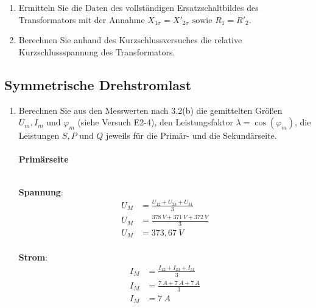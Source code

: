 \begin{enumerate}[label=\alph*)]
	\item Ermitteln Sie die Daten des vollständigen Ersatzschaltbildes des Transformators
	      mit der Annahme $X_{1\sigma} = X'_{2\sigma} \text{ sowie } R_1 = R'_2$.

	\item Berechnen Sie anhand des Kurzschlussversuches die relative Kurzschlussspannung
	      des Transformators.

\end{enumerate}
\subsection{Symmetrische Drehstromlast}
\begin{enumerate}[label=\alph*)]

	\item Berechnen Sie aus den Messwerten nach 3.2(b) die gemittelten Größen $U_m, I_m
		      \text{ und } \varphi_m$ (siehe Versuch E2-4), den Leistungsfaktor $\lambda =
		      \cos(\varphi_m)$, die Leistungen $S, P \text{ und } Q$ jeweils für die Primär-
	      und die Sekundärseite.\\ \ \\

	      \textbf{Primärseite}\\ \ \\

	      \begin{tcolorbox}[colback=gray!30,
			      colframe=black,
			      width=0.9\textwidth,
		      ]
		      \parbox{\textwidth}{

			      \begin{minipage}{0.5\textwidth}
				      \textbf{Spannung}:
				      \begin{align*}
					      U_M & = \frac{U_{12} + U_{23} + U_{31}}{3} \\
					      U_M & = \frac{378\ V + 371\ V + 372\ V}{3} \\
					      U_M & = 373,67\ V                          \\
				      \end{align*}
			      \end{minipage}\hfill
			      \begin{minipage}{0.5\textwidth}
				      \textbf{Strom}:
				      \begin{align*}
					      I_M & = \frac{I_{12} + I_{23} + I_{31}}{3} \\
					      I_M & = \frac{7\ A + 7\ A + 7\ A}{3}       \\
					      I_M & = 7\ A                               \\
				      \end{align*}
			      \end{minipage}
		      }
	      \end{tcolorbox}


\end{enumerate}
